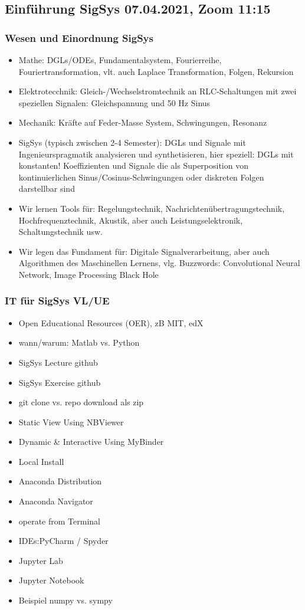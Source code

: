\newpage
\subsection*{Einführung SigSys 07.04.2021, Zoom 11:15}

\subsubsection*{Wesen und Einordnung SigSys}
\begin{itemize}
\item Mathe: DGLs/ODEs, Fundamentalsystem, Fourierreihe, Fouriertransformation,
vlt. auch Laplace Transformation, Folgen, Rekursion
\item Elektrotecchnik: Gleich-/Wechselstromtechnik an RLC-Schaltungen mit
zwei speziellen Signalen: Gleichspannung und 50 Hz Sinus
\item Mechanik: Kräfte auf Feder-Masse System, Schwingungen, Resonanz
\item SigSys (typisch zwischen 2-4 Semester): DGLs und Signale mit
Ingenieurspragmatik analysieren und synthetisieren, hier speziell: DGLs mit
konstanten! Koeffizienten und Signale die als Superposition von kontinuierlichen
Sinus/Cosinus-Schwingungen oder diskreten Folgen darstellbar sind
\item Wir lernen Tools für: Regelungstechnik, Nachrichtenübertragungstechnik,
Hochfrequenztechnik, Akustik, aber auch Leistungselektronik, Schaltungstechnik
usw.
\item Wir legen das Fundament für: Digitale Signalverarbeitung, aber auch
Algorithmen des Maschinellen Lernens, vlg. Buzzwords: Convolutional Neural Network,
Image Processing Black Hole
\end{itemize}

\subsubsection*{IT für SigSys VL/UE}
\begin{itemize}
\item Open Educational Resources (OER), zB MIT, edX
\item wann/warum: Matlab vs. Python
\item SigSys Lecture github
\item SigSys Exercise github
\item git clone vs. repo download als zip
\item Static View Using NBViewer
\item Dynamic \& Interactive Using MyBinder
\item Local Install
\item Anaconda Distribution
\item Anaconda Navigator
\item operate from Terminal
\item IDEs:PyCharm / Spyder
\item Jupyter Lab
\item Jupyter Notebook
\item Beispiel numpy vs. sympy
\end{itemize}
